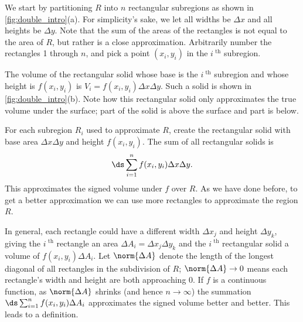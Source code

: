 We start by partitioning $R$ into $n$ rectangular subregions as shown in \autoref{fig:double_intro}(a). For simplicity's sake, we let all widths be $\Delta x$ and all heights be $\Delta y$. Note that the sum of the areas of the rectangles is not equal to the area of $R$, but rather is a close approximation. Arbitrarily number the rectangles 1 through $n$, and pick a point $(x_i,y_i)$ in the $i^\text{ th}$ subregion. 

The volume of the rectangular solid whose base is the $i^\text{ th}$ subregion and whose height is $f(x_i,y_i)$ is $V_i=f(x_i,y_i)\Delta x\Delta y$. Such a  solid is shown in \autoref{fig:double_intro}(b). Note how this rectangular solid only approximates the true volume under the surface; part of the solid is above the surface and part is below.

For each subregion $R_i$ used to approximate $R$, create the rectangular solid with base area $\Delta x\Delta y$ and height $f(x_i,y_i)$. The sum of all rectangular solids is
\[\ds \sum_{i=1}^n f(x_i,y_i)\Delta x\Delta y.\]
This approximates the signed volume under $f$ over $R$. As we have done before, to get a better approximation we can use more rectangles to approximate the region $R$.

In general, each rectangle could have a different width $\Delta x_j$ and height $\Delta y_k$, giving the $i^\text{ th}$ rectangle an area $\Delta A_i = \Delta x_j\Delta y_k$ and the $i^\text{ th}$ rectangular solid a volume of $f(x_i,y_i)\Delta A_i$. Let $\norm{\Delta A}$ denote the length of the longest diagonal of all rectangles in the subdivision of $R$; $\norm{\Delta A}\to 0$ means each rectangle's width and height are both approaching 0. If $f$ is a continuous function, as $\norm{\Delta A}$ shrinks (and hence $n\to\infty$) the summation $\ds \sum_{i=1}^n f(x_i,y_i)\Delta A_i$ approximates the signed volume better and better. This leads to a definition.


